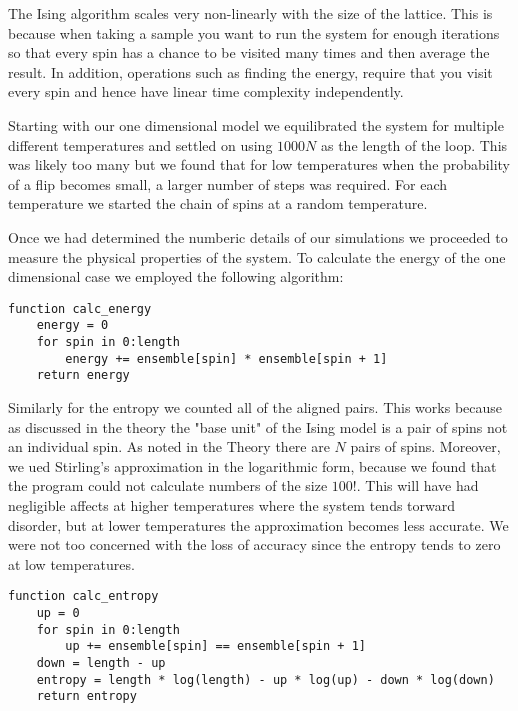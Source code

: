 \documentclass[a4paper]{article}
\begin{document}
\begin{multicols}{2}
        The Ising algorithm scales very non-linearly with the size of %
        the lattice. This is because when taking a sample you want to run %
        the system for enough iterations so that every spin has a chance %
        to be visited many times and then average the result. In addition, %
        operations such as finding the energy, require that you visit every %
        spin and hence have linear time complexity independently. 


        Starting with our one dimensional model we equilibrated the %
        system for multiple different temperatures and settled on %
        using \(1000N\) as the length of the loop. This was likely %
        too many but we found that for low temperatures when the %
        probability of a flip becomes small, a larger number of %
        steps was required. For each temperature we started the chain %
        of spins at a random temperature. 


        Once we had determined the numberic details of our simulations %
        we proceeded to measure the physical properties of the system. %
        To calculate the energy of the one dimensional case we employed %
        the following algorithm:
        \begin{verbatim}
function calc_energy
    energy = 0
    for spin in 0:length
        energy += ensemble[spin] * ensemble[spin + 1]
    return energy
        \end{verbatim}
        

        Similarly for the entropy we counted all of the aligned pairs. %
        This works because as discussed in the theory the "base unit" %
        of the Ising model is a pair of spins not an individual spin. %
        As noted in the Theory there are \(N\) pairs of spins. Moreover, %
        we ued Stirling's approximation in the logarithmic form, because %
        we found that the program could not calculate numbers of the size %
        \(100!\). This will have had negligible affects at higher %
        temperatures where the system tends torward disorder, but at %
        lower temperatures the approximation becomes less accurate. %
        We were not too concerned with the loss of accuracy since the %
        entropy tends to zero at low temperatures.
        \begin{verbatim}
function calc_entropy
    up = 0
    for spin in 0:length
        up += ensemble[spin] == ensemble[spin + 1]
    down = length - up
    entropy = length * log(length) - up * log(up) - down * log(down)
    return entropy
        \end{verbatim}



\end{multicols}
\end{document}

